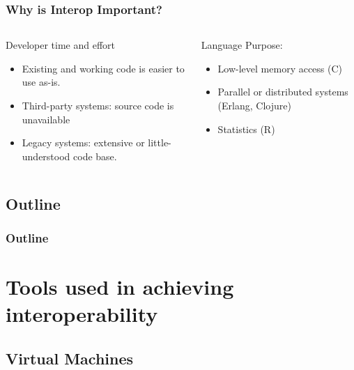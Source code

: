 \documentclass{beamer}
\begin{document}
\begin{frame}
  \frametitle{Why is Interop Important?}
  
  \begin{columns}[t]
  \begin{column}{0.5\textwidth}
  Developer time and effort
  \begin{itemize}
	\item Existing and working code is easier to use as-is.
  	\item Third-party systems: source code is unavailable
	\item Legacy systems: extensive or little-understood code base.
  \end{itemize}
  \end{column}  


  \begin{column}{0.5\textwidth}
  Language Purpose:
  \begin{itemize}
  	\item Low-level memory access (C)
  	\item Parallel or distributed systems (Erlang, Clojure)
  	\item Statistics (R)
  \end{itemize}
  \end{column}
  \end{columns}
  
\end{frame}

\subsection*{Outline}

\begin{frame}
  \frametitle{Outline}
  \tableofcontents[hideallsubsections]
\end{frame}

\section[Interop Tools]{Tools used in achieving interoperability}

\subsection{Virtual Machines}
\end{document}
